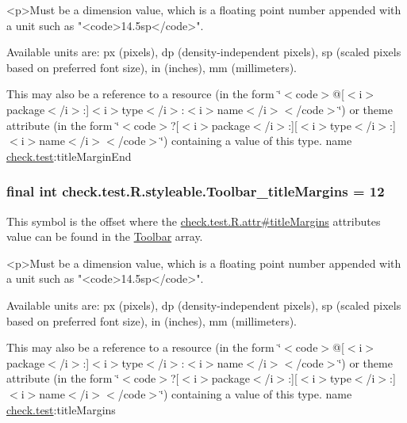 \begin{DoxyVerb}      <p>Must be a dimension value, which is a floating point number appended with a unit such as "<code>14.5sp</code>".
\end{DoxyVerb}
 Available units are\+: px (pixels), dp (density-\/independent pixels), sp (scaled pixels based on preferred font size), in (inches), mm (millimeters). 

This may also be a reference to a resource (in the form \char`\"{}$<$code$>$@\mbox{[}$<$i$>$package$<$/i$>$\+:\mbox{]}$<$i$>$type$<$/i$>$\+:$<$i$>$name$<$/i$>$$<$/code$>$\char`\"{}) or theme attribute (in the form \char`\"{}$<$code$>$?\mbox{[}$<$i$>$package$<$/i$>$\+:\mbox{]}\mbox{[}$<$i$>$type$<$/i$>$\+:\mbox{]}$<$i$>$name$<$/i$>$$<$/code$>$\char`\"{}) containing a value of this type.  name \hyperlink{namespacecheck_1_1test}{check.\+test}\+:title\+Margin\+End \hypertarget{classcheck_1_1test_1_1_r_1_1styleable_a198e72fff825b1e6049c5dbbb9265945}{}
\subsubsection[{Toolbar\+\_\+title\+Margins}]{\setlength{\rightskip}{0pt plus 5cm}final int check.\+test.\+R.\+styleable.\+Toolbar\+\_\+title\+Margins = 12\hspace{0.3cm}{\ttfamily [static]}}\label{classcheck_1_1test_1_1_r_1_1styleable_a198e72fff825b1e6049c5dbbb9265945}
This symbol is the offset where the \hyperlink{classcheck_1_1test_1_1_r_1_1attr_a088a77fc6e1f7916d5c036ebebe5ab5c}{check.\+test.\+R.\+attr\#title\+Margins} attribute\textquotesingle{}s value can be found in the \hyperlink{classcheck_1_1test_1_1_r_1_1styleable_a1a7fa90223693abef77e7484cca2df54}{Toolbar} array.

\begin{DoxyVerb}      <p>Must be a dimension value, which is a floating point number appended with a unit such as "<code>14.5sp</code>".
\end{DoxyVerb}
 Available units are\+: px (pixels), dp (density-\/independent pixels), sp (scaled pixels based on preferred font size), in (inches), mm (millimeters). 

This may also be a reference to a resource (in the form \char`\"{}$<$code$>$@\mbox{[}$<$i$>$package$<$/i$>$\+:\mbox{]}$<$i$>$type$<$/i$>$\+:$<$i$>$name$<$/i$>$$<$/code$>$\char`\"{}) or theme attribute (in the form \char`\"{}$<$code$>$?\mbox{[}$<$i$>$package$<$/i$>$\+:\mbox{]}\mbox{[}$<$i$>$type$<$/i$>$\+:\mbox{]}$<$i$>$name$<$/i$>$$<$/code$>$\char`\"{}) containing a value of this type.  name \hyperlink{namespacecheck_1_1test}{check.\+test}\+:title\+Margins \hypertarget{classcheck_1_1test_1_1_r_1_1styleable_a4a55fbefdcf687934e2c57f3a12cfb1d}{}

